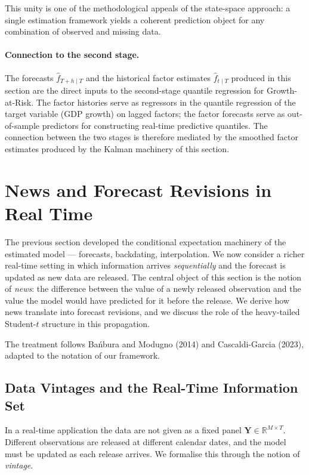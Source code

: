 \documentclass[11pt, a4paper, oneside]{article}
\begin{document}
This unity is one of the methodological
appeals of the state-space approach: a single estimation framework
yields a coherent prediction object for any combination of observed
and missing data.

\paragraph{Connection to the second stage.}
The forecasts $\hat{f}_{T+h \mid T}$ and the historical factor
estimates $\hat{f}_{t \mid T}$ produced in this section are the
direct inputs to the second-stage quantile regression for
Growth-at-Risk. The factor histories serve as regressors in the
quantile regression of the target variable (GDP growth) on lagged
factors; the factor forecasts serve as out-of-sample predictors for
constructing real-time predictive quantiles. The connection between
the two stages is therefore mediated by the smoothed factor estimates
produced by the Kalman machinery of this section.

\newpage 

\section{News and Forecast Revisions in Real Time}
\label{sec:news}

The previous section developed the conditional expectation machinery
of the estimated model — forecasts, backdating, interpolation. We now
consider a richer real-time setting in which information arrives
\emph{sequentially} and the forecast is updated as new data are
released. The central object of this section is the notion of
\emph{news}: the difference between the value of a newly released
observation and the value the model would have predicted for it
before the release. We derive how news translate into forecast
revisions, and we discuss the role of the heavy-tailed Student-$t$
structure in this propagation.

The treatment follows Ba\'nbura and Modugno (2014) and
Cascaldi-Garcia (2023), adapted to the notation of our framework.

\subsection{Data Vintages and the Real-Time Information Set}
\label{subsec:vintages}

In a real-time application the data are not given as a fixed panel
$\mathbf{Y} \in \mathbb{R}^{M \times T}$. Different observations are
released at different calendar dates, and the model must be updated
as each release arrives. We formalise this through the notion of
\emph{vintage}.
\end{document}
